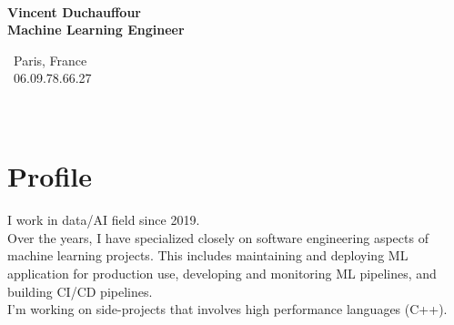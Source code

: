 \documentclass[a4paper,10pt]{article}
\begin{document}
\thispagestyle{empty}


\begin{adjustbox}{valign=t}
    \begin{minipage}{0.32\textwidth}
        \begin{center}
            {\Large \bfseries \\Vincent Duchauffour}\\
            {\large \bfseries Machine Learning Engineer}\\[1cm]
            \raggedright
            \vspace{-.5cm}
            \faHome~Paris, France\\
            \faPhone~06.09.78.66.27\\
            \textcolor{ColorTwo}{\faEnvelopeO}
            \\
            \textcolor{ColorTwo}{\faLinkedin}
            \\
            \textcolor{ColorTwo}{\faGithub}
        \end{center}
        \vspace{-.5cm}
        \section*{Profile}
        \justifying
        I work in data/AI field since 2019. \\Over the years, I have specialized closely on software engineering aspects of machine learning projects. This includes maintaining and deploying ML application for production use, developing and monitoring ML pipelines, and building CI/CD pipelines. \\I'm working on side-projects that involves high performance languages (C++).
        \vspace{-.5cm}

\end{minipage}
\end{adjustbox}
\end{document}
